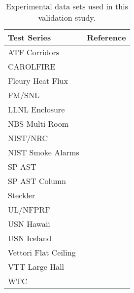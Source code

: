 \begin{table}[!ht]
\caption[Experimental data sets used in this validation study]
{Experimental data sets used in this validation study.}

\begin{center}
\begin{tabular}{|l|c|}
\hline
Test Series           &  Reference                                  \\ \hline \hline
ATF Corridors         &  \cite{Sheppard:Corridors}                  \\ \hline
CAROLFIRE             &  \cite{CAROLFIRE}                           \\ \hline
Fleury Heat Flux      &  \cite{Fleury:Masters}                      \\ \hline
FM/SNL                &  \cite{Nowlen:NUREG4681, Nowlen:NUREG4527}  \\ \hline
LLNL Enclosure        &  \cite{Foote:LLNL1986}                      \\ \hline
NBS Multi-Room        &  \cite{Peacock:NBS_Multi-Room}              \\ \hline
NIST/NRC              &  \cite{Hamins:SP1013-1}                     \\ \hline
NIST Smoke Alarms     &  \cite{Bukowski:1}                          \\ \hline
SP AST                &  \cite{Wickstrom_AST}                       \\ \hline
SP AST Column         &  \cite{Sjostrom:AST}                        \\ \hline
Steckler              &  \cite{Steckler:NBSIR_82-2520}              \\ \hline
UL/NFPRF              &  \cite{Sheppard:1, McGrattan:5}             \\ \hline
USN Hawaii            &  \cite{Gott:1}                              \\ \hline
USN Iceland           &  \cite{Gott:1}                              \\ \hline
Vettori Flat Ceiling  &  \cite{Vettori:1}                           \\ \hline
VTT Large Hall        &  \cite{Hostikka:VTT2104}                    \\ \hline
WTC                   &  \cite{NIST_NCSTAR_1-5B}                    \\ \hline
\end{tabular}
\end{center}
\label{tab:exp_data_sets}
\end{table}